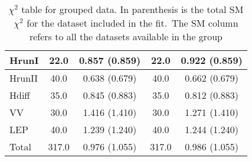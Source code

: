 \documentclass{article}
\begin{document}
\begin{table}[H]
\begin{tabular}{|l|c|c|c|c|}
HrunI & 22.0                         & 0.857                             (0.859) & 22.0                         & 0.922                             (0.859) \\ \hline
HrunII & 40.0                         & 0.638                             (0.679) & 40.0                         & 0.662                             (0.679) \\ \hline
Hdiff & 35.0                         & 0.845                             (0.883) & 35.0                         & 0.812                             (0.883) \\ \hline
VV & 30.0                         & 1.416                             (1.410) & 30.0                         & 1.271                             (1.410) \\ \hline
LEP & 40.0                         & 1.239                             (1.240) & 40.0                         & 1.244                             (1.240) \\ \hline
 \hline Total & 317.0                 & 0.976                     (1.055) & 317.0                 & 0.986                     (1.055) \\ \hline
\end{tabular}
\caption{$\chi^2$ table for grouped data. In parenthesis is the total SM $\chi^2$ for the dataset included in the fit.\
                    The SM column refers to all the datasets available in the group}
\end{table}
\end{document}
